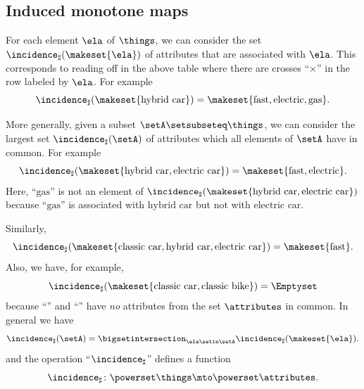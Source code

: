 \subsection{Induced monotone maps}

For each element $\ela$ of $\things$, we can consider the set $\incidence_\sharp(\makeset{\ela})$ of attributes that are associated with $\ela$.
This corresponds to reading off in the above table where there are crosses ``$\times$'' in the row labeled by $\ela$.
For example
\begin{equation}\label{eq:fca-example-pushforward-1}
    \incidence_\sharp(\makeset{\text{hybrid car}}) = \makeset{\text{fast}, \text{electric}, \text{gas}}.
\end{equation}

More generally, given a subset $\setA \setsubseteq \things$, we can consider the largest set $\incidence_\sharp(\setA)$ of attributes which all elements of $\setA$ have in common.
For example
\begin{equation}\label{eq:fca-example-pushforward-2}
    \incidence_\sharp(\makeset{\text{hybrid car}, \text{electric car}}) = \makeset{\text{fast}, \text{electric}}.
\end{equation}
Here, ``$\text{gas}$'' is not an element of $\incidence_\sharp(\makeset{\text{hybrid car}, \text{electric car}})$ because ``$\text{gas}$'' is associated with $\text{hybrid car}$ but not with $\text{electric car}$.

Similarly,
\begin{equation}\label{eq:fca-example-pushforward-3}
    \incidence_\sharp(\makeset{\text{classic car}, \text{hybrid car}, \text{electric car}}) = \makeset{\text{fast}}.
\end{equation}
Also, we have, for example,
\begin{equation}\label{eq:fca-example-pushforward-4}
    \incidence_\sharp(\makeset{\text{classic car}, \text{classic bike}}) = \Emptyset
\end{equation}
because ``'' and ``'' have \emph{no} attributes from the set $\attributes$ in common.
In general we have
\begin{equation}\label{eq:fca-example-pushforward-5}
    \incidence_\sharp(\setA) = \bigsetintersection_{\ela \setin \setA} \incidence_\sharp(\makeset{\ela}).
\end{equation}
and the operation ``$\incidence_\sharp$'' defines a function
\begin{equation}\label{eq:fca-example-pushforward-6}
    \incidence_\sharp \colon \powerset \things \mto \powerset \attributes.
\end{equation}

